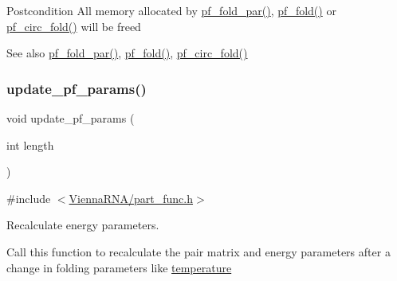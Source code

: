 \begin{DoxyPostcond}{Postcondition}
All memory allocated by \hyperlink{group__part__func__global__deprecated_gac4f95bee734b2563a3d6e9932117ebdf}{pf\+\_\+fold\+\_\+par()}, \hyperlink{group__part__func__global__deprecated_gadc3db3d98742427e7001a7fd36ef28c2}{pf\+\_\+fold()} or \hyperlink{group__part__func__global__deprecated_ga819ce5fca8984004ac81c4a3b04cb735}{pf\+\_\+circ\+\_\+fold()} will be free\textquotesingle{}d 
\end{DoxyPostcond}
\begin{DoxySeeAlso}{See also}
\hyperlink{group__part__func__global__deprecated_gac4f95bee734b2563a3d6e9932117ebdf}{pf\+\_\+fold\+\_\+par()}, \hyperlink{group__part__func__global__deprecated_gadc3db3d98742427e7001a7fd36ef28c2}{pf\+\_\+fold()}, \hyperlink{group__part__func__global__deprecated_ga819ce5fca8984004ac81c4a3b04cb735}{pf\+\_\+circ\+\_\+fold()} 
\end{DoxySeeAlso}
\mbox{\label{group__part__func__global__deprecated_ga384e927890f9c034ff09fa66da102d28}} 
\subsubsection{\texorpdfstring{update\+\_\+pf\+\_\+params()}{update\_pf\_params()}}
{\footnotesize\ttfamily void update\+\_\+pf\+\_\+params (\begin{DoxyParamCaption}\item[{int}]{length }\end{DoxyParamCaption})}



{\ttfamily \#include $<$\hyperlink{part__func_8h}{Vienna\+R\+N\+A/part\+\_\+func.\+h}$>$}



Recalculate energy parameters. 

Call this function to recalculate the pair matrix and energy parameters after a change in folding parameters like \hyperlink{group__model__details_gab4b11c8d9c758430960896bc3fe82ead}{temperature}


